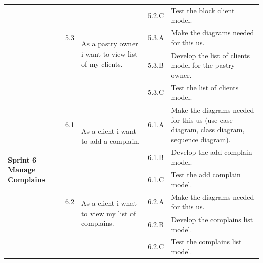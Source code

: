 \documentclass[12pt,a4paper]{report}
\begin{document}
	\begin{table}[H]
	\begin{center}
		\setlength\doublerulesep{0.5pt}
		\begin{tabular}{|  p{3cm}|  p{1cm}| p{4cm}|  p{1cm}| p{6cm}|}
	
			\cline{4-5}    
			&                   
			&                                 
			&                        
			5.2.C &                        
			Test the block client model.
			\\
			\cline{2-5}  
			
			&                       
			5.3  &  
			\multirow{2}{4cm}{As a pastry owner i want to view list of my clients.}
			
			&				                      
			5.3.A &                        
			Make the diagrams needed for this \ac{us}.
			\\ 
			\cline{4-5}    
			&                   
			&                                 
			&                        
			5.3.B &                        
			Develop the list of clients model for the pastry owner.
			\\ 
			\cline{4-5}    
			&                   
			&                                 
			&                        
			5.3.C &                        
			Test the list of clients model.
				\\
			\hline
			\multirow{5}{3cm}{\textbf{Sprint 6} \textbf{Manage Complains} }
			&                       
			6.1  &  
			\multirow{2}{4cm}{As a client i want to add a complain.}
			
			&				                      
			6.1.A &                        
			Make the diagrams needed for this \ac{us} (use case diagram, class diagram, sequence diagram).
			\\ 
			\cline{4-5}    
			&                   
			&                                 
			&                        
			6.1.B &                        
			Develop the add complain model.
			\\ 
			\cline{4-5}    
			&                   
			&                                 
			&                        
			6.1.C &                        
			Test the add complain model.
			\\
			\cline{2-5}  
			
			&                       
			6.2  &  
			\multirow{2}{4cm}{As a client i wnat to view my list of complains.}
			
			&				                      
			6.2.A &                        
			Make the diagrams needed for this \ac{us}.
			\\ 
			\cline{4-5}    
			&                   
			&                                 
			&                        
			6.2.B &                        
			Develop the complains list model.
			\\ 
			\cline{4-5}    
			&                   
			&                                 
			&                        
			6.2.C &                        
			Test the complains list model.
			\\
			\cline{2-5}  
			

\end{tabular}
\end{center}
\end{table}
\end{document}
